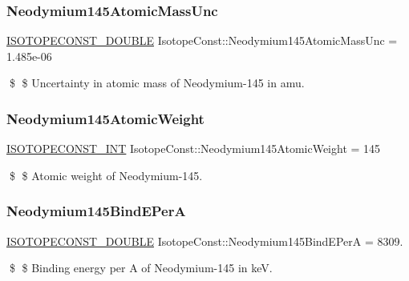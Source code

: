\subsubsection{\texorpdfstring{Neodymium145\+Atomic\+Mass\+Unc}{Neodymium145AtomicMassUnc}}
{\footnotesize\ttfamily \mbox{\hyperlink{group___isotope_const-_macros_ga8f45a7272ce02c0b4c65c44636ed719a}{I\+S\+O\+T\+O\+P\+E\+C\+O\+N\+S\+T\+\_\+\+D\+O\+U\+B\+LE}} Isotope\+Const\+::\+Neodymium145\+Atomic\+Mass\+Unc = 1.\+485e-\/06}

\$ \$ Uncertainty in atomic mass of Neodymium-\/145 in amu. \mbox{\label{group___isotope_const-_neodymium-_nd145_gae03c9ffa05d41faf858c2f26e27a302d}} 
\subsubsection{\texorpdfstring{Neodymium145\+Atomic\+Weight}{Neodymium145AtomicWeight}}
{\footnotesize\ttfamily \mbox{\hyperlink{group___isotope_const-_macros_ga5f18360b3e99483a35c32d789e62621c}{I\+S\+O\+T\+O\+P\+E\+C\+O\+N\+S\+T\+\_\+\+I\+NT}} Isotope\+Const\+::\+Neodymium145\+Atomic\+Weight = 145}

\$ \$ Atomic weight of Neodymium-\/145. \mbox{\label{group___isotope_const-_neodymium-_nd145_ga5abbd5d8128280b7f04db7930ea42b11}} 
\subsubsection{\texorpdfstring{Neodymium145\+Bind\+E\+PerA}{Neodymium145BindEPerA}}
{\footnotesize\ttfamily \mbox{\hyperlink{group___isotope_const-_macros_ga8f45a7272ce02c0b4c65c44636ed719a}{I\+S\+O\+T\+O\+P\+E\+C\+O\+N\+S\+T\+\_\+\+D\+O\+U\+B\+LE}} Isotope\+Const\+::\+Neodymium145\+Bind\+E\+PerA = 8309.}

\$ \$ Binding energy per A of Neodymium-\/145 in keV. \mbox{\label{group___isotope_const-_neodymium-_nd145_ga1d4386cf0c263b159938edb27c988731}} 
